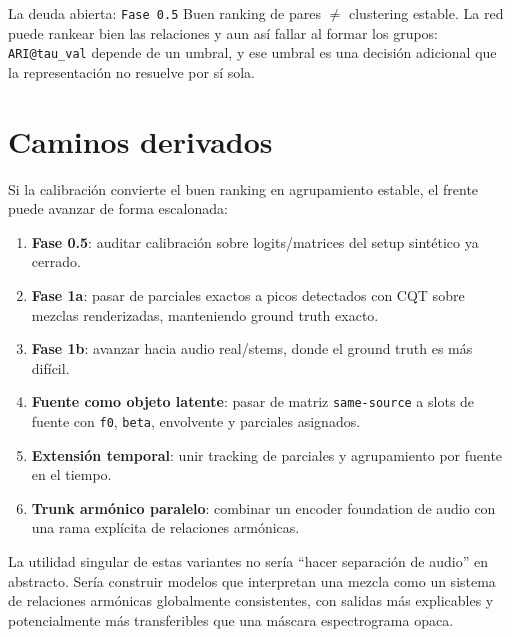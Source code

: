 \documentclass[11pt]{article}
\begin{document}
\begin{alertbox}{La deuda abierta: \texttt{Fase 0.5}}
Buen ranking de pares $\neq$ clustering estable. La red puede rankear bien las relaciones y aun así fallar al formar los grupos: \texttt{ARI@tau\_val} depende de un umbral, y ese umbral es una decisión adicional que la representación no resuelve por sí sola.
\end{alertbox}

\section{Caminos derivados}

Si la calibración convierte el buen ranking en agrupamiento estable, el frente puede avanzar de forma escalonada:

\begin{enumerate}
  \item \textbf{Fase 0.5}: auditar calibración sobre logits/matrices del setup sintético ya cerrado.
  \item \textbf{Fase 1a}: pasar de parciales exactos a picos detectados con CQT sobre mezclas renderizadas, manteniendo ground truth exacto.
  \item \textbf{Fase 1b}: avanzar hacia audio real/stems, donde el ground truth es más difícil.
  \item \textbf{Fuente como objeto latente}: pasar de matriz \texttt{same-source} a slots de fuente con \texttt{f0}, \texttt{beta}, envolvente y parciales asignados.
  \item \textbf{Extensión temporal}: unir tracking de parciales y agrupamiento por fuente en el tiempo.
  \item \textbf{Trunk armónico paralelo}: combinar un encoder foundation de audio con una rama explícita de relaciones armónicas.
\end{enumerate}

La utilidad singular de estas variantes no sería ``hacer separación de audio'' en abstracto. Sería construir modelos que interpretan una mezcla como un sistema de relaciones armónicas globalmente consistentes, con salidas más explicables y potencialmente más transferibles que una máscara espectrograma opaca.
\end{document}
